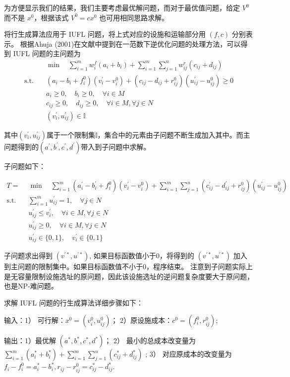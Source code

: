 \documentclass[UTF8]{article}
\begin{document}
为方便显示我们的结果，我们主要考虑最优解问题，而对于最优值问题，给定 $V^0$ 而不是 $x^0$，根据该式 $V^0 = cx^0$ 也可用相同思路求解。

将行生成算法应用于 IUFL 问题，将上式对应的设施和运输部分用 $(f,c)$ 分别表示。
根据Ahuja (2001)在文献中提到在一范数下逆优化问题的处理方法，可以得到 IUFL 问题的主问题为
\begin{align*}
&\min \quad \sum_{i=1}^m w_i^f(a_i+b_i)+\sum_{i=1}^m\sum_{j=1}^n w_{ij}^r(c_{ij}+d_{ij})\\
\text{s.t.}\quad & (a_i-b_i+f_i^0)(v_i^{'}-v_i^{0}) + (c_{ij}-d_{ij}+r_{ij}^0)(u_{ij}^{'}-u_{ij}^{0})  \geq 0 \\
& a_i \geq 0 ,\quad b_i \geq 0,\quad \forall i \in M \\
& c_{ij} \geq 0, \quad d_{ij} \geq 0, \quad \forall i \in M, \forall j \in N\\
& (v_i^{'},u_{ij}^{'}) \in \mathbb{I}
\end{align*}

其中$(v_i^{'},u_{ij}^{'})$属于一个限制集$\mathbb{I}$，集合中的元素由子问题不断生成加入其中。而主问题得到的$(a^{'},b^{'},c^{'},d^{'})$带入到子问题中求解。

子问题如下：

\begin{align*}
T = &\min \quad \sum_{i=1}^m(a_i^{'}-b_i^{'}+f_i^0)(v_i^{'}-v_i^{0})+\sum_{i=1}^m\sum_{j=1}^n(c_{ij}^{'}-d_{ij}^{'}+r_{ij}^0)(u_{ij}^{'}-u_{ij}^{0}) \\
\text{s.t.}\quad & \sum_{i=1}^m u_{ij}^{'} =1, \quad \forall j\in N \\
& u_{ij}^{'} \leq v_{i}^{'}, \quad \forall i \in M, \forall j \in N \\
& u_{ij}^{'} \geq 0, \quad \forall i \in M, \forall j \in N \\
&u_{ij}^{'} \in \{0,1\} ,\quad v_{i}^{'} \in \{0,1\}
\end{align*}

子问题求出得到 $(v^{'*},u^{'*})$, 如果目标函数值小于0，将得到的 $(v^{'*},u^{'*})$ 加入到主问题的限制集中。如果目标函数值不小于0，程序结束。
注意到子问题实际上是无容量限制设施选址的原问题，因此该设施选址的逆问题复杂度要大于原问题，也是NP-难问题。

求解 IUFL 问题的行生成算法详细步骤如下：

输入：1） 可行解：$x^0=(v_i^0,u_{ij}^0)$； 2）原设施成本：$c^0=(f_i^0,r_{ij}^0)$;

输出：1）最优解 $(a^{*},b^{*},c^{*},d^{*})$；
2） 最小的总成本改变量为
$\sum_{i=1}^m(a^{*}_i+b^{*}_i)+\sum_{i=1}^m\sum_{j=1}^n(c^{*}_{ij}+d^{*}_{ij})$ ;
3） 对应原成本的改变量为 $f_i-f_i^0 = a^{*}_i-b^{*}_i,r_{ij}-r_{ij}^0=c^{*}_{ij}-d^{*}_{ij}$.
\end{document}
